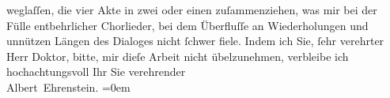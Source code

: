 \begin{ledgroupsized}[t]{13cm}
                    weglaſſen, die vier Akte in zwei oder einen zuſammenziehen, was mir bei der
                    Fülle entbehrlicher Chorlieder, bei dem Überfluſſe an Wiederholungen und
                    unnützen Längen des Dialoges nicht ſchwer fiele. Indem ich Sie, ſehr verehrter
                    Herr Doktor, bitte, mir dieſe Arbeit nicht übelzunehmen, verbleibe ich
                    hochachtungsvoll\pend
           \pstart
           Ihr Sie verehrender{\\[\baselineskip]}\spacefill\mbox{Albert Ehrenstein.}\pend
           \leftskip=0em{}
         
         \endnumbering{}\end{ledgroupsized}  \newcommand{\dateiname}{L01640}\newcommand{\titel}{Albert Ehrenstein an Arthur Schnitzler, 30. 11. 1906}\newcommand{\editorInnen}{Martin Anton Müller und Gerd-Hermann Susen}
      